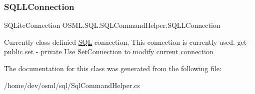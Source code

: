 \subsubsection{\texorpdfstring{SQLLConnection}{SQLLConnection}}
{\footnotesize\ttfamily S\+Q\+Lite\+Connection O\+S\+M\+L.\+S\+Q\+L.\+S\+Q\+L\+Command\+Helper.\+S\+Q\+L\+L\+Connection\hspace{0.3cm}{\ttfamily [get]}}



Currently class definied \mbox{\hyperlink{namespaceOSML_1_1SQL}{S\+QL}} connection. This connection is currently used. get -\/ public set -\/ private Use Set\+Connection to modify current connection 



The documentation for this class was generated from the following file\+:\begin{DoxyCompactItemize}
\item 
/home/dev/osml/sql/Sql\+Command\+Helper.\+cs\end{DoxyCompactItemize}
